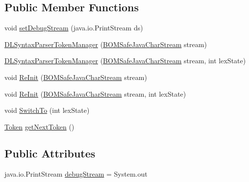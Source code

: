 \subsection*{Public Member Functions}
\begin{DoxyCompactItemize}
\item 
void \hyperlink{classuk_1_1ac_1_1manchester_1_1cs_1_1owlapi_1_1dlsyntax_1_1parser_1_1_d_l_syntax_parser_token_manager_ae7f11ad13dfbb15845296c6eb232b461}{set\-Debug\-Stream} (java.\-io.\-Print\-Stream ds)
\item 
\hyperlink{classuk_1_1ac_1_1manchester_1_1cs_1_1owlapi_1_1dlsyntax_1_1parser_1_1_d_l_syntax_parser_token_manager_a8b20f355cd7be66acf7138ed2f460650}{D\-L\-Syntax\-Parser\-Token\-Manager} (\hyperlink{classuk_1_1ac_1_1manchester_1_1cs_1_1_b_o_m_safe_java_char_stream}{B\-O\-M\-Safe\-Java\-Char\-Stream} stream)
\item 
\hyperlink{classuk_1_1ac_1_1manchester_1_1cs_1_1owlapi_1_1dlsyntax_1_1parser_1_1_d_l_syntax_parser_token_manager_afc18f3a081c5e388e925828128ae6101}{D\-L\-Syntax\-Parser\-Token\-Manager} (\hyperlink{classuk_1_1ac_1_1manchester_1_1cs_1_1_b_o_m_safe_java_char_stream}{B\-O\-M\-Safe\-Java\-Char\-Stream} stream, int lex\-State)
\item 
void \hyperlink{classuk_1_1ac_1_1manchester_1_1cs_1_1owlapi_1_1dlsyntax_1_1parser_1_1_d_l_syntax_parser_token_manager_a325848c43880d5991bcf4661019254c9}{Re\-Init} (\hyperlink{classuk_1_1ac_1_1manchester_1_1cs_1_1_b_o_m_safe_java_char_stream}{B\-O\-M\-Safe\-Java\-Char\-Stream} stream)
\item 
void \hyperlink{classuk_1_1ac_1_1manchester_1_1cs_1_1owlapi_1_1dlsyntax_1_1parser_1_1_d_l_syntax_parser_token_manager_adf455b672b5a7686d7b1f9cf80697f75}{Re\-Init} (\hyperlink{classuk_1_1ac_1_1manchester_1_1cs_1_1_b_o_m_safe_java_char_stream}{B\-O\-M\-Safe\-Java\-Char\-Stream} stream, int lex\-State)
\item 
void \hyperlink{classuk_1_1ac_1_1manchester_1_1cs_1_1owlapi_1_1dlsyntax_1_1parser_1_1_d_l_syntax_parser_token_manager_a9bf74d6b71a7ebe68a1a99a17a5c676b}{Switch\-To} (int lex\-State)
\item 
\hyperlink{classuk_1_1ac_1_1manchester_1_1cs_1_1owlapi_1_1dlsyntax_1_1parser_1_1_token}{Token} \hyperlink{classuk_1_1ac_1_1manchester_1_1cs_1_1owlapi_1_1dlsyntax_1_1parser_1_1_d_l_syntax_parser_token_manager_a0890ebcdb19b7dc8b4c5accf13b6a9f2}{get\-Next\-Token} ()
\end{DoxyCompactItemize}
\subsection*{Public Attributes}
\begin{DoxyCompactItemize}
\item 
java.\-io.\-Print\-Stream \hyperlink{classuk_1_1ac_1_1manchester_1_1cs_1_1owlapi_1_1dlsyntax_1_1parser_1_1_d_l_syntax_parser_token_manager_a545622d4c7f00c8118eb708a091a2075}{debug\-Stream} = System.\-out
\end{DoxyCompactItemize}
